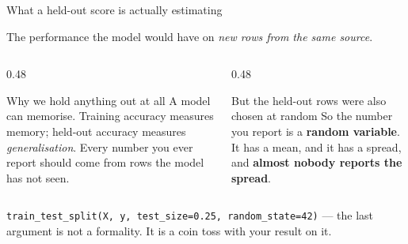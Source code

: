 \documentclass[aspectratio=169]{beamer}
\begin{document}
\begin{frame}[shrink=6]{What a held-out score is actually estimating}
  \begin{exampleblock}{}
    \centering\large
    The performance the model would have on \emph{new rows from the same
    source}.
  \end{exampleblock}
  \vspace{0.3em}
  \begin{columns}[T]
    \begin{column}{0.48\textwidth}
      \begin{block}{Why we hold anything out at all}
        \small A model can memorise. Training accuracy measures memory;
        held-out accuracy measures \emph{generalisation}. Every number you
        ever report should come from rows the model has not seen.
      \end{block}
    \end{column}
    \begin{column}{0.48\textwidth}
      \begin{alertblock}{But the held-out rows were also chosen at random}
        \small So the number you report is a \textbf{random variable}. It has
        a mean, and it has a spread, and \textbf{almost nobody reports the
        spread}.
      \end{alertblock}
    \end{column}
  \end{columns}
  \vspace{0.2em}
  \begin{center}\small
    \texttt{train\_test\_split(X, y, test\_size=0.25, random\_state=42)}
    --- the last argument is not a formality. It is a coin toss with your
    result on it.
  \end{center}
\end{frame}
\end{document}
